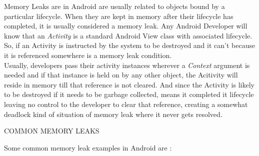\documentclass[journal]{IEEEtran}
\begin{document}
Memory Leaks are in Android are usually related to objects bound by a particular lifecycle. When they are kept in memory after their lifecycle has completed, it is usually considered a memory leak. Any Android Developer will know that an \emph{Activity} is a standard Android View class with associated lifecycle. So, if an Activity is instructed by the system to be destroyed and it can't because it is referenced somewhere is a memory leak condition.\\

Usually, developers pass their activity instances wherever a \emph{Context} argument is needed and if that instance is held on by any other object, the Acitivity will reside in memory till that reference is not cleared. And since the Activity is likely to be destroyed if it needs to be garbage collected, means it completed it lifecycle leaving no control to the developer to clear that reference, creating a somewhat deadlock kind of situation of memory leak where it never gets resolved.\\

\begin{center}
	COMMON MEMORY LEAKS
\end{center}

Some common memory leak examples in Android are :\\
\end{document}
